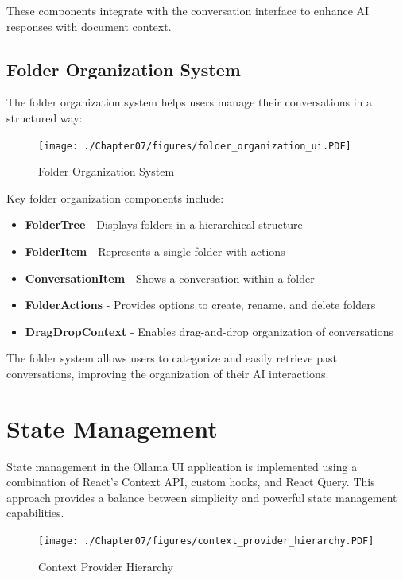 These components integrate with the conversation interface to enhance AI responses with document context.

\subsection{Folder Organization System}

The folder organization system helps users manage their conversations in a structured way:

\begin{figure}
    \centering
    \texttt{[image: ./Chapter07/figures/folder\_organization\_ui.PDF]}
    \caption{Folder Organization System}
    \label{fig:folder-organization-ui}
\end{figure}
\clearpage

Key folder organization components include:

\begin{itemize}
  \item \textbf{FolderTree} - Displays folders in a hierarchical structure
  \item \textbf{FolderItem} - Represents a single folder with actions
  \item \textbf{ConversationItem} - Shows a conversation within a folder
  \item \textbf{FolderActions} - Provides options to create, rename, and delete folders
  \item \textbf{DragDropContext} - Enables drag-and-drop organization of conversations
\end{itemize}

The folder system allows users to categorize and easily retrieve past conversations, improving the organization of their AI interactions.

\section{State Management}

State management in the Ollama UI application is implemented using a combination of React's Context API, custom hooks, and React Query. This approach provides a balance between simplicity and powerful state management capabilities.

\begin{figure}
    \centering
    \texttt{[image: ./Chapter07/figures/context\_provider\_hierarchy.PDF]}
    \caption{Context Provider Hierarchy}
    \label{fig:context-provider-hierarchy}
\end{figure}
\clearpage


